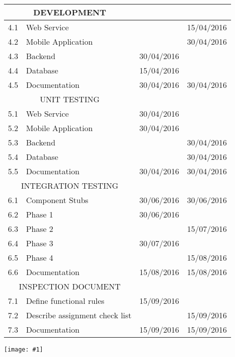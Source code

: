 \documentclass[11pt, a4paper,titlepage]{article}
\newcommand{\image}[1]{
	\begin{center}
		\noindent \texttt{[image: \#1]}
	\end{center}
}
\begin{document}
			\begin{tabularx}{\textwidth}{|l|X|c|c|}
				\hline
		\multicolumn{2}{c}{DEVELOPMENT}	 &  & \\
		\hline
		4.1 & 	Web Service &   & 15/04/2016 \\
		4.2 & 	Mobile Application &   & 30/04/2016 \\
		4.3 & 	Backend & 30/04/2016  &  \\
		4.4 & 	Database & 15/04/2016  &  \\
		4.5 & 	Documentation & 30/04/2016  & 30/04/2016 \\
		\hline
		\multicolumn{2}{c}{UNIT TESTING} &  & \\
		\hline
		5.1 & 	Web Service & 30/04/2016  &  \\
		5.2 & 	Mobile Application & 30/04/2016  &  \\
		5.3 & 	Backend &   & 30/04/2016 \\
		5.4 & 	Database &   & 30/04/2016 \\
		5.5 & 	Documentation & 30/04/2016  & 30/04/2016 \\
		\hline
		\multicolumn{2}{c}{INTEGRATION TESTING}	 &  & \\
		\hline
		6.1 & 	Component Stubs & 30/06/2016  & 30/06/2016 \\
		6.2 & 	Phase 1 & 30/06/2016  &  \\
		6.3 & 	Phase 2 &   & 15/07/2016 \\
		6.4 & 	Phase 3 & 30/07/2016 &  \\
		6.5 & 	Phase 4 &   & 15/08/2016 \\
		6.6 & 	Documentation & 15/08/2016 & 15/08/2016 \\
		\hline
		\multicolumn{2}{c}{INSPECTION DOCUMENT} &  & \\
		\hline
		7.1 & 	Define functional rules & 15/09/2016 &  \\
		7.2 & 	Describe assignment check list &   & 15/09/2016 \\
		7.3 & 	Documentation & 15/09/2016 & 15/09/2016 \\
		\hline
	\end{tabularx}
	\newline
	\image{ganttdiagramm.png}
		\newpage
\end{document}
